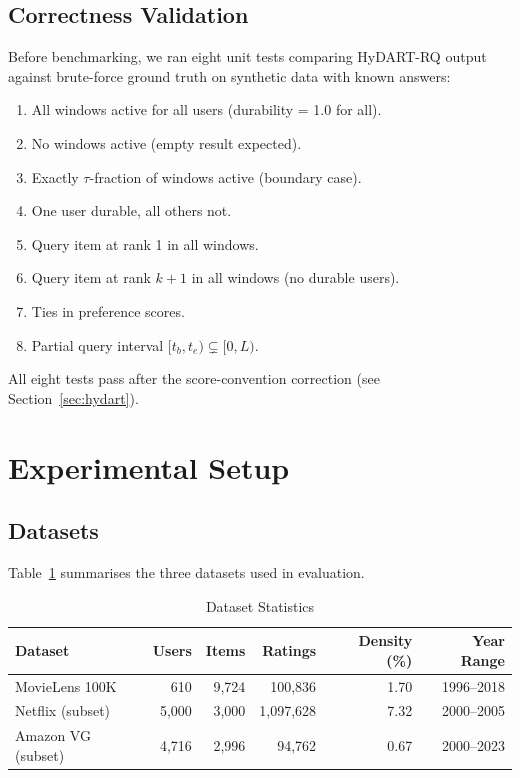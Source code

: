 \subsection{Correctness Validation}

Before benchmarking, we ran eight unit tests comparing HyDART-RQ output against brute-force ground truth on synthetic data with known answers:
\begin{enumerate}
  \item All windows active for all users (durability = 1.0 for all).
  \item No windows active (empty result expected).
  \item Exactly $\tau$-fraction of windows active (boundary case).
  \item One user durable, all others not.
  \item Query item at rank 1 in all windows.
  \item Query item at rank $k+1$ in all windows (no durable users).
  \item Ties in preference scores.
  \item Partial query interval $[t_b, t_e) \subsetneq [0, L)$.
\end{enumerate}
All eight tests pass after the score-convention correction (see Section~\ref{sec:hydart}).

\section{Experimental Setup}

\subsection{Datasets}

Table~\ref{tab:datasets} summarises the three datasets used in evaluation.

\begin{table}[htbp]
\centering
\caption{Dataset Statistics}
\label{tab:datasets}
\begin{tabular}{lrrrrr}
\toprule
\textbf{Dataset} & \textbf{Users} & \textbf{Items} & \textbf{Ratings} & \textbf{Density (\%)} & \textbf{Year Range} \\
\midrule
MovieLens 100K  &    610 &  9{,}724 &   100{,}836 & 1.70  & 1996--2018 \\
Netflix (subset)& 5{,}000 &  3{,}000 & 1{,}097{,}628 & 7.32 & 2000--2005 \\
Amazon VG (subset)& 4{,}716 &  2{,}996 &    94{,}762 & 0.67  & 2000--2023 \\
\bottomrule
\end{tabular}
\end{table}

